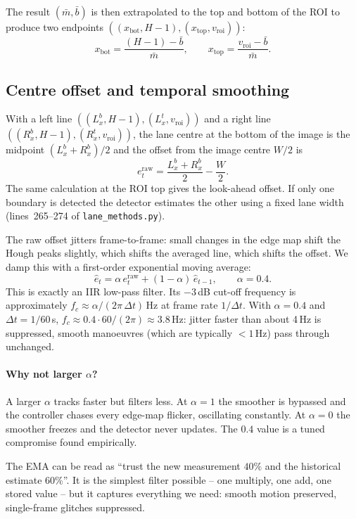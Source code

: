 The result $(\bar m, \bar b)$ is then extrapolated to the top and
bottom of the ROI to produce two endpoints
$((x_{\text{bot}}, H-1), (x_{\text{top}}, v_{\text{roi}}))$:
\[
x_{\text{bot}} = \frac{(H-1) - \bar b}{\bar m},\qquad
x_{\text{top}} = \frac{v_{\text{roi}} - \bar b}{\bar m}.
\]

\subsection{Centre offset and temporal smoothing}

With a left line $((L_x^b, H{-}1), (L_x^t, v_{\text{roi}}))$ and a
right line $((R_x^b, H{-}1), (R_x^t, v_{\text{roi}}))$, the lane
centre at the bottom of the image is the midpoint
$(L_x^b + R_x^b)/2$ and the offset from the image centre $W/2$ is
\[
e_t^{\text{raw}} = \frac{L_x^b + R_x^b}{2} - \frac{W}{2}.
\]
The same calculation at the ROI top gives the look-ahead offset. If
only one boundary is detected the detector estimates the other using
a fixed lane width (lines~265--274 of \texttt{lane\_methods.py}).

The raw offset jitters frame-to-frame: small changes in the edge map
shift the Hough peaks slightly, which shifts the averaged line, which
shifts the offset. We damp this with a first-order exponential moving
average:
\begin{equation}
\hat e_t = \alpha\,e_t^{\text{raw}} + (1-\alpha)\,\hat e_{t-1},
\qquad \alpha = 0.4.
\label{eq:ema}
\end{equation}
This is exactly an IIR low-pass filter. Its $-3$\,dB cut-off
frequency is approximately $f_c \approx \alpha/(2\pi\,\Delta t)$\,Hz at
frame rate $1/\Delta t$. With $\alpha=0.4$ and $\Delta t=1/60$\,s,
$f_c \approx 0.4\cdot 60/(2\pi)\approx 3.8$\,Hz: jitter faster than
about 4\,Hz is suppressed, smooth manoeuvres (which are typically
$<1$\,Hz) pass through unchanged.

\paragraph{Why not larger $\alpha$?}
A larger $\alpha$ tracks faster but filters less. At $\alpha=1$ the
smoother is bypassed and the controller chases every edge-map
flicker, oscillating constantly. At $\alpha=0$ the smoother freezes
and the detector never updates. The $0.4$ value is a tuned compromise
found empirically.

\begin{intuition}
The EMA can be read as ``trust the new measurement $40\%$ and the
historical estimate $60\%$''. It is the simplest filter possible --
one multiply, one add, one stored value -- but it captures everything
we need: smooth motion preserved, single-frame glitches suppressed.
\end{intuition}

